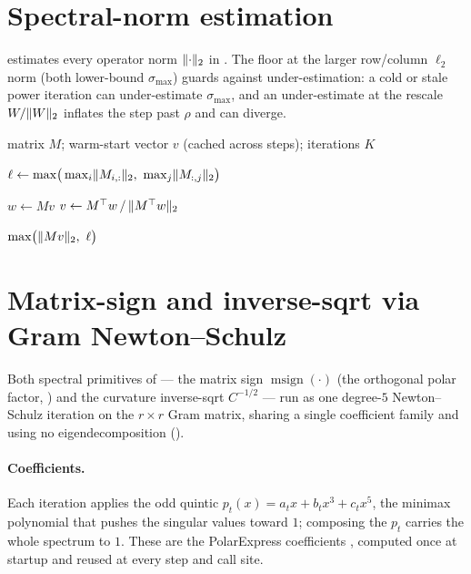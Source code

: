 \documentclass[11pt]{article}
\newcommand{\smax}{\sigma_{\max}}
\DeclarePairedDelimiter{\norm}{\lVert}{\rVert}
\DeclareMathOperator{\polar}{msign}          %
\theoremstyle{plain}
\theoremstyle{definition}
\theoremstyle{remark}
\begin{document}
\section{Spectral-norm estimation}
\label{app:smax}
 estimates every operator norm $\norm{\cdot}_2$ in . The floor at the larger row/column $\ell_2$ norm (both lower-bound $\smax$) guards against under-estimation: a cold or stale power iteration can under-estimate $\smax$, and an under-estimate at the rescale $W/\norm{W}_2$ inflates the step past $\rho$ and can diverge.

\begin{algorithm}[h]
\caption{Guarded spectral-norm estimate of $\norm{M}_2$}
\label{alg:smax}
\begin{algorithmic}[1]
\Require matrix $M$; warm-start vector $v$ (cached across steps); iterations $K$
\Statex

\State $\ell\gets\max\!\big(\max_i\norm{M_{i,:}}_2,\ \max_j\norm{M_{:,j}}_2\big)$
\Statex

 
  \State $w\gets Mv$
  \State $v\gets M^\top w \,/\, \norm{M^\top w}_2$
\EndFor
\Statex

\State \Return $\max\!\big(\norm{Mv}_2,\ \ell\big)$ 
\end{algorithmic}
\end{algorithm}

\section{Matrix-sign and inverse-sqrt via Gram Newton--Schulz}
\label{app:gramns}
Both spectral primitives of  --- the matrix sign $\polar(\cdot)$ (the
orthogonal polar factor, ) and the curvature inverse-sqrt $C^{-1/2}$ ---
run as one degree-$5$ Newton--Schulz iteration on the $r\times r$ Gram matrix, sharing a
single coefficient family and using no eigendecomposition ().

\paragraph{Coefficients.} Each iteration applies the odd quintic
$p_t(x)=a_t x+b_t x^3+c_t x^5$, the minimax polynomial that pushes the singular values
toward $1$; composing the $p_t$ carries the whole spectrum to $1$. These are the
PolarExpress coefficients \cite{polarexpress}, computed once at startup and reused at
every step and call site.
\end{document}
